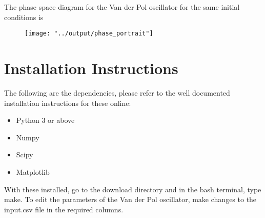 \documentclass{report}
\begin{document}
The phase space diagram for the Van der Pol oscillator for the same initial conditions is
\begin{figure}[ht]
\texttt{[image: "../output/phase\_portrait"]}
\caption{} %
\label{phaseportrait}
\end{figure}


\section{Installation Instructions}

The following are the dependencies, please refer to the well documented installation instructions for these online:
\begin{itemize}
	\item Python 3 or above
	\item Numpy
	\item Scipy
	\item Matplotlib
\end{itemize}

With these installed, go to the download directory and in the bash terminal, type make.
To edit the parameters of the Van der Pol oscillator, make changes to the input.csv file in the required columns.
\end{document}
